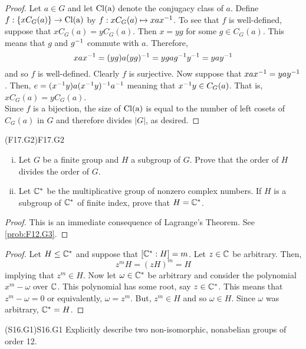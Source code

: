 \documentclass[../../AlgebraQualSolutions.tex]{subfiles}
\begin{document}
	\begin{proof}
		Let $a \in G$ and let $\rm{Cl}(a)$ denote the conjugacy class of $a$. Define $f: \{xC_G(a)\} \to \rm{Cl}(a)$ by $f: xC_G(a) \mapsto xax^{-1}$. To see that $f$ is well-defined, suppose that $xC_G(a) = yC_G(a)$. Then $x = yg$ for some $g \in C_G(a)$. This means that $g$ and $g^{-1}$ commute with $a$. Therefore,
			\[xax^{-1} = (yg)a(yg)^{-1} = ygag^{-1} y^{-1} = yay^{-1}\]
		and so $f$ is well-defined. Clearly $f$ is surjective. Now suppose that $xax^{-1} = yay^{-1}$. Then, $e = (x^{-1} y)a(x^{-1} y)^{-1} a^{-1}$ meaning that $x^{-1} y \in C_G(a)$. That is, $xC_G(a) = yC_G(a)$.\\
	
		Since $f$ is a bijection, the size of $\rm{Cl}(a)$ is equal to the number of left cosets of $C_G(a)$ in $G$ and therefore divides $|G|$, as desired.
	\end{proof}

\begin{prob}{(F17.G2)}{F17.G2}
	\begin{enumerate}[(i)]
		\item Let $G$ be a finite group and $H$ a subgroup of $G$. Prove that the order of $H$ divides the order of $G$.
		\item Let $\mathbb{C}^*$ be the multiplicative group of nonzero complex numbers. If $H$ is a subgroup of $\mathbb{C}^*$ of finite index, prove that $H = \mathbb{C}^*$.
	\end{enumerate}
\end{prob}

\begin{proof}
	This is an immediate consequence of Lagrange's Theorem. See \ref{prob:F12.G3}.
\end{proof}

\begin{proof}
	Let $H \leq \mathbb{C}^*$ and suppose that $[\mathbb{C}^*: H] = m$. Let $z \in \mathbb{C}$ be arbitrary. Then,
		\[z^mH = (zH)^m = H\]
	implying that $z^m \in H$. Now let $\omega \in \mathbb{C}^*$ be arbitrary and consider the polynomial $x^m - \omega$ over $\mathbb{C}$. This polynomial has some root, say $z \in \mathbb{C}^*$. This means that $z^m - \omega = 0$ or equivalently, $\omega = z^m$. But, $z^m \in H$ and so $\omega \in H$. Since $\omega$ was arbitrary, $\mathbb{C}^* = H$.
\end{proof}

\begin{prob}{(S16.G1)}{S16.G1}
	Explicitly describe two non-isomorphic, nonabelian groups of order 12.
\end{prob}
\end{document}

